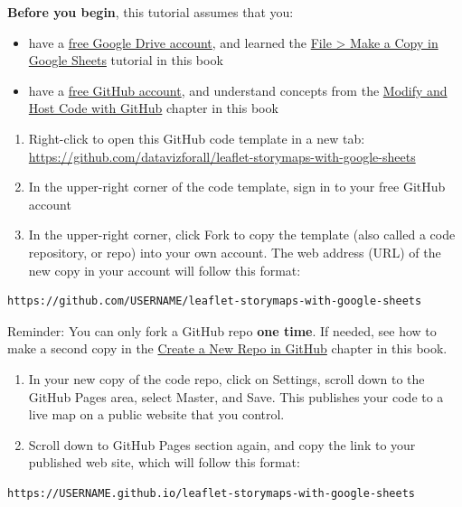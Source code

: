 \documentclass[
  english,
]{book}
\providecommand{\tightlist}{%
  \setlength{\itemsep}{0pt}\setlength{\parskip}{0pt}}
\begin{document}
\textbf{Before you begin}, this tutorial assumes that you:

\begin{itemize}
\tightlist
\item
  have a \href{http://drive.google.com}{free Google Drive account}, and learned the \href{copy}{File \textgreater{} Make a Copy in Google Sheets} tutorial in this book
\item
  have a \href{http://github.com}{free GitHub account}, and understand concepts from the \href{github}{Modify and Host Code with GitHub} chapter in this book
\end{itemize}

\begin{enumerate}
\def\labelenumi{\arabic{enumi})}
\item
  Right-click to open this GitHub code template in a new tab: \url{https://github.com/datavizforall/leaflet-storymaps-with-google-sheets}
\item
  In the upper-right corner of the code template, sign in to your free GitHub account
\item
  In the upper-right corner, click Fork to copy the template (also called a code repository, or repo) into your own account.
  The web address (URL) of the new copy in your account will follow this format:
\end{enumerate}

\begin{verbatim}
https://github.com/USERNAME/leaflet-storymaps-with-google-sheets
\end{verbatim}

Reminder: You can only fork a GitHub repo \textbf{one time}. If needed, see how to make a second copy in the \href{create-repo}{Create a New Repo in GitHub} chapter in this book.

\begin{enumerate}
\def\labelenumi{\arabic{enumi})}
\setcounter{enumi}{3}
\item
  In your new copy of the code repo, click on Settings, scroll down to the GitHub Pages area, select Master, and Save. This publishes your code to a live map on a public website that you control.
\item
  Scroll down to GitHub Pages section again, and copy the link to your published web site, which will follow this format:
\end{enumerate}

\begin{verbatim}
https://USERNAME.github.io/leaflet-storymaps-with-google-sheets
\end{verbatim}
\end{document}

